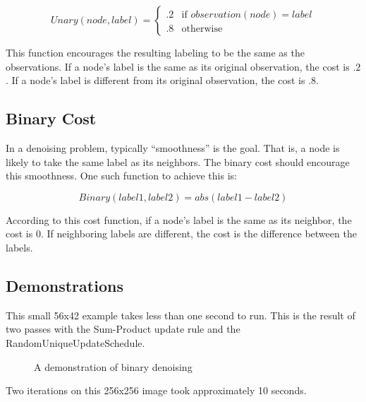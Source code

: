\documentclass{InsightArticle}
\begin{document}
\begin{equation}
Unary(node, label) = 
\begin{cases} 
.2 & \text{if } observation(node) = label
\\
.8 & \text{otherwise }
\end{cases}
\end{equation}

This function encourages the resulting labeling to be the same as the observations.  If a node's label is the same as its original observation, the cost is $.2$. If a node's label is different from its original observation, the cost is $.8$.

\subsection{Binary Cost}
In a denoising problem, typically ``smoothness'' is the goal. That is, a node is likely to take the same label as its neighbors. The binary cost should encourage this  smoothness. One such function to achieve this is:

\begin{equation}
Binary(label1, label2) = abs(label1-label2)
\end{equation}

According to this cost function, if a node's label is the same as its neighbor, the cost is $0$. If neighboring labels are different, the cost is the difference between the labels.

\subsection{Demonstrations}

This small 56x42 example takes less than one second to run. This is the result of two passes with the Sum-Product update rule and the RandomUniqueUpdateSchedule.

\begin{figure}[H]
\centering
{}
\caption{A demonstration of binary denoising}
\label{fig:RiceSmall}
\end{figure}

Two iterations on this 256x256 image took approximately 10 seconds.
\end{document}

